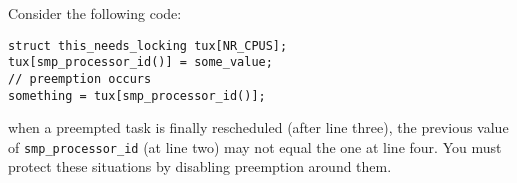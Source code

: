 Consider the following code: 
\begin{verbatim}
struct this_needs_locking tux[NR_CPUS];
tux[smp_processor_id()] = some_value;
// preemption occurs
something = tux[smp_processor_id()];
\end{verbatim}
when a preempted task is finally rescheduled (after line three), the previous value of \texttt{smp\_processor\_id} (at line two) may not equal the one at line four. 
You must protect these situations by disabling preemption around them.








